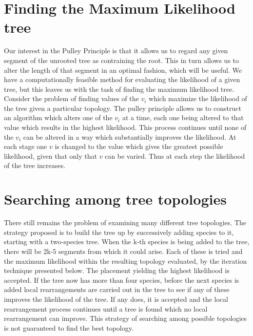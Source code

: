 \section{Finding the Maximum Likelihood tree}
Our interest in the Pulley Principle is that it allows us to regard any given segment of the unrooted tree as contraining the root. This in turn allows us to alter the length of that segment in an optimal fashion, which will be useful.
We have a computationally feasible method for evaluating the likelihood of a given tree, but this leaves us with the task of finding the maximum likelihood tree.
\\
Consider the problem of finding values of the $v_i$ which maximize the likelihood of the tree given a particular topology.
The pulley principle allows us to construct an algorithm which alters one of the $v_i$ at a time, each one being altered to that value which results in the highest likelihood. This process continues until none of the $v_i$ can be altered
in a way which substantially improves the likelihood. At each stage one $v$ is changed to the value which gives the greatest possible likelihood, given that only that $v$ can be varied. Thus at each step the likelihood of the tree increases.

\section{Searching among tree topologies}
There still remains the problem of examining many different tree topologies. 
The strategy proposed is to build the tree up by successively adding species to it, starting with a two-species tree. When the k-th species is being added to the tree, there will be 2k-5 segments from which it could arise. 
Each of these is tried and the maximum likelihood within the resulting topology evaluated, by the iteration technique presented below.
The placement yielding the highest likelihood is accepted.
If the tree now has more than four species, before the next species is added local rearrangements are carried out in the tree to see if any of these improves the likelihood of the tree. 
If any does, it is accepted and the local rearrangement process continues until a tree is found which no local rearrangement can improve.
This strategy of searching among possible topologies is not guaranteed to find the best topology.

